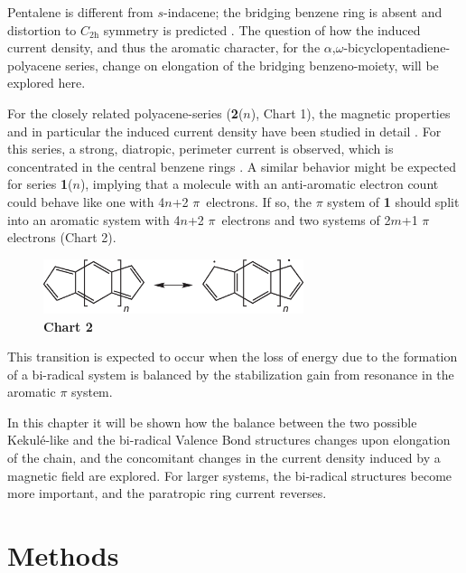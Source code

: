 Pentalene is different from $s$-indacene; the bridging benzene ring is absent and distortion to $C_\mathrm{2h}$ symmetry is predicted  \cite{r16,r17}. The question of how the induced current density, and thus the aromatic character, for the $\alpha$,$\omega$-bicyclopentadiene-polyacene series, change on elongation of the bridging benzeno-moiety, will be explored here.

For the closely related polyacene-series (\textbf{2}($n$), Chart 1), the magnetic properties and in particular the induced current density have been studied in detail  \cite{r18,r19}. For this series, a strong, diatropic, perimeter current is observed, which is concentrated in the central benzene rings  \cite{r18}. A similar behavior might be expected for series \textbf{1}($n$), implying that a molecule with an anti-aromatic electron count could behave like one with 4$n$+2 \mbox{$\pi$ electrons}. If so, the $\pi$ system of \textbf{1} should split into an aromatic system with 4$n$+2 \mbox{$\pi$ electrons} and two systems of 2$m$+1 $\pi$ electrons (Chart 2).
\begin{figure}[htp]
\center
\includegraphics[width=3in]{indacene/figures/chart2.eps}\\
\textbf{Chart 2}
\end{figure}
This transition is expected to occur when the loss of energy due to the formation of a bi-radical system is balanced by the stabilization gain from resonance in the aromatic $\pi$ system.

In this chapter it will be shown how the balance between the two possible Kekul\'e-like and the bi-radical Valence Bond structures changes upon elongation of the chain, and the
concomitant changes in the current density induced by a magnetic field are explored. For larger systems, the bi-radical structures become more important, and the paratropic ring current reverses.

\section{Methods}

